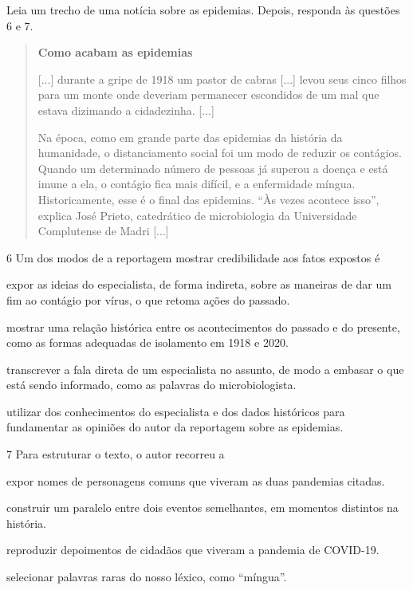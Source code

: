 Leia um trecho de uma notícia sobre as epidemias. Depois, responda às
questões 6 e 7.

\begin{quote}
\textbf{Como acabam as epidemias}

{[}...{]} durante a gripe de 1918 um pastor de cabras {[}...{]} levou
seus cinco filhos para um monte onde deveriam permanecer escondidos de
um mal que estava dizimando a cidadezinha. {[}...{]}

Na época, como em grande parte das epidemias da história da humanidade,
o distanciamento social foi um modo de reduzir os contágios. Quando um
determinado número de pessoas já superou a doença e está imune a ela, o
contágio fica mais difícil, e a enfermidade míngua. Historicamente, esse
é o final das epidemias. ``Às vezes acontece isso'', explica José
Prieto, catedrático de microbiologia da Universidade Complutense de
Madri {[}...{]}

\end{quote}

\num{6} Um dos modos de a reportagem mostrar credibilidade aos fatos
expostos é

\begin{escolha}
\item expor as ideias do especialista, de forma indireta, sobre as
maneiras de dar um fim ao contágio por vírus, o que retoma ações do
passado.

\item mostrar uma relação histórica entre os acontecimentos do passado e
do presente, como as formas adequadas de isolamento em 1918 e 2020.

\item transcrever a fala direta de um especialista no assunto, de modo a
embasar o que está sendo informado, como as palavras do microbiologista.

\item utilizar dos conhecimentos do especialista e dos dados históricos
para fundamentar as opiniões do autor da reportagem sobre as epidemias.
\end{escolha}

\num{7} Para estruturar o texto, o autor recorreu a

\begin{escolha}
\item expor nomes de personagens comuns que viveram as duas pandemias
citadas.

\item construir um paralelo entre dois eventos semelhantes, em momentos
distintos na história.

\item reproduzir depoimentos de cidadãos que viveram a pandemia de
COVID-19.

\item selecionar palavras raras do nosso léxico, como ``míngua''.

\end{escolha}

